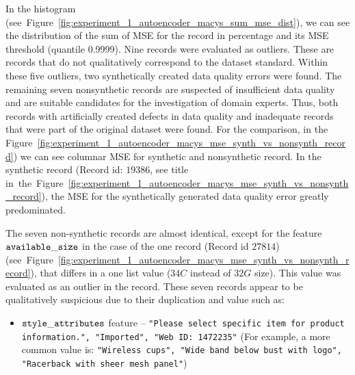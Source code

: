 				
					In the histogram (see~Figure~\ref{fig:experiment_1_autoencoder_macys_sum_mse_dist}), we can see the distribution of the sum of MSE for the record in percentage and its MSE threshold (quantile 0.9999). Nine records were evaluated as outliers. These are records that do not qualitatively correspond to the dataset standard. Within these five outliers, two synthetically created data quality errors were found. The remaining seven nonsynthetic records are suspected of insufficient data quality and are suitable candidates for the investigation of domain experts. Thus, both records with artificially created defects in data quality and inadequate records that were part of the original dataset were found. For the comparison, in the Figure~\ref{fig:experiment_1_autoencoder_macys_mse_synth_vs_nonsynth_record}) we can see columnar MSE for synthetic and nonsynthetic record. In the synthetic record (Record id: $19386$, see title in~the~Figure~\ref{fig:experiment_1_autoencoder_macys_mse_synth_vs_nonsynth_record}), the MSE for the synthetically generated data quality error greatly predominated.
					
										
					The seven non-synthetic records are almost identical, except for the feature ${\operatorname{\mathtt{available\_size}}}$ in the case of the one record (Record id $27814$)(see~Figure~\ref{fig:experiment_1_autoencoder_macys_mse_synth_vs_nonsynth_record}), that differs in a one list value ($34C$ instead of $32G$ size). This value was evaluated as an outlier in the record. These seven records appear to be qualitatively suspicious due to their duplication and value such as:
					
					\begin{itemize}
						\item ${\operatorname{\mathtt{style\_attributes}}}$ feature -- \texttt{"Please select specific item for product information.", "Imported", "Web ID: 1472235"} (For example, a more common value is: \texttt{"Wireless cups", "Wide band below bust with logo", "Racerback with sheer mesh panel"})
					\end{itemize}
					
